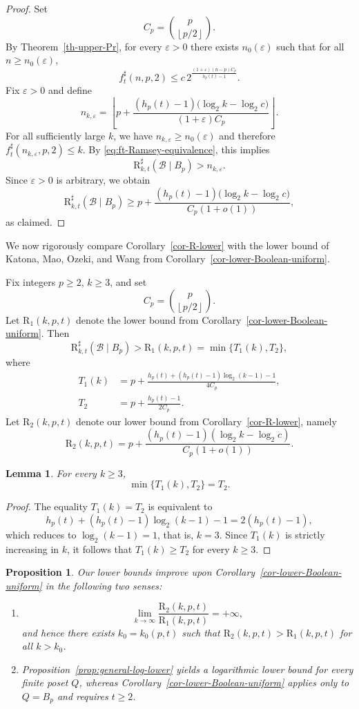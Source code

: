 \documentclass[twoside,12pt]{article}
\newcommand{\flr}[1]{\left\lfloor #1 \right\rfloor}
\newcommand{\floor}[1]{\flr{#1}}
\newtheorem{lemma}[theorem]{Lemma}
\newtheorem{proposition}[theorem]{Proposition}
\newcommand{\BRs}{\mathrm{R}^{\sharp}}
\begin{document}
\begin{proof}
Set
\[
C_p=\binom{p}{\floor{p/2}}.
\]
By Theorem~\ref{th-upper-Pr}, for every $\varepsilon>0$ there exists $n_0(\varepsilon)$ such that for all $n\ge n_0(\varepsilon)$,
\[
f_t^\sharp(n,p,2)
\le
c\,2^{\frac{(1+\varepsilon)(n-p)C_p}{h_p(t)-1}}.
\]
Fix $\varepsilon>0$ and define
\[
n_{k,\varepsilon}=\left\lfloor p+\frac{(h_p(t)-1)\bigl(\log_2 k-\log_2 c\bigr)}{(1+\varepsilon)C_p}\right\rfloor.
\]
For all sufficiently large $k$, we have $n_{k,\varepsilon}\ge n_0(\varepsilon)$ and therefore $f_t^\sharp(n_{k,\varepsilon},p,2)\le k$. By \eqref{eq:ft-Ramsey-equivalence}, this implies
\[
\BRs_{k,t}(\mathcal B\mid B_p)>n_{k,\varepsilon}.
\]
Since $\varepsilon>0$ is arbitrary, we obtain
\[
\BRs_{k,t}(\mathcal B\mid B_p)
\ge
p+\frac{(h_p(t)-1)\bigl(\log_2 k-\log_2 c\bigr)}{C_p(1+o(1))},
\]
as claimed.
\end{proof}

We now rigorously compare Corollary~\ref{cor-R-lower} with the lower bound of Katona, Mao, Ozeki, and Wang from Corollary~\ref{cor-lower-Boolean-uniform}.

Fix integers $p\ge2$, $k\ge3$, and set
\[
C_p=\binom{p}{\floor{p/2}}.
\]
Let $\mathrm{R}_{1}(k,p,t)$ denote the lower bound from Corollary~\ref{cor-lower-Boolean-uniform}. Then
\[
\BRs_{k,t}(\mathcal B\mid B_p) > \mathrm{R}_{1}(k,p,t)=\min\{T_1(k),T_2\},
\]
where
\[
\begin{aligned}
T_1(k)&=p+\frac{h_p(t)+(h_p(t)-1)\log_2(k-1)-1}{4C_p},\\
T_2&=p+\frac{h_p(t)-1}{2C_p}.
\end{aligned}
\]
Let $\mathrm{R}_{2}(k,p,t)$ denote our lower bound from Corollary~\ref{cor-R-lower}, namely
\[
\mathrm{R}_{2}(k,p,t)
=
p+\frac{(h_p(t)-1)(\log_2 k-\log_2 c)}{C_p(1+o(1))}.
\]

\begin{lemma}\label{lem-DKB}
For every $k\ge3$,
\[
\min\{T_1(k),T_2\}=T_2.
\]
\end{lemma}

\begin{proof}
The equality $T_1(k)=T_2$ is equivalent to
\[
h_p(t)+(h_p(t)-1)\log_2(k-1)-1=2(h_p(t)-1),
\]
which reduces to $\log_2(k-1)=1$, that is, $k=3$. Since $T_1(k)$ is strictly increasing in $k$, it follows that $T_1(k)\ge T_2$ for every $k\ge3$.
\end{proof}

\begin{proposition}\label{pro-compa}
Our lower bounds improve upon Corollary~\ref{cor-lower-Boolean-uniform} in the following two senses:
\begin{enumerate}
    \item[(i)]
    \[
    \lim_{k\to\infty}\frac{\mathrm{R}_{2}(k,p,t)}{\mathrm{R}_{1}(k,p,t)}=+\infty,
    \]
    and hence there exists $k_0=k_0(p,t)$ such that $\mathrm{R}_{2}(k,p,t)>\mathrm{R}_{1}(k,p,t)$ for all $k>k_0$.
    \item[(ii)] Proposition~\ref{prop:general-log-lower} yields a logarithmic lower bound for every finite poset $Q$, whereas Corollary~\ref{cor-lower-Boolean-uniform} applies only to $Q=B_p$ and requires $t\ge2$.
\end{enumerate}
\end{proposition}
\end{document}
